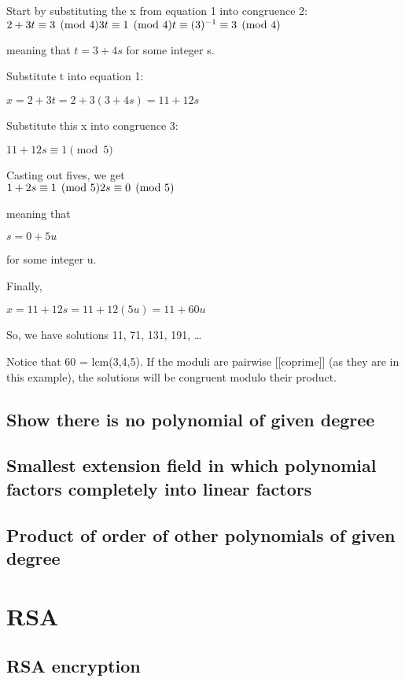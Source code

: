 \documentclass{article}
\begin{document}
Start by substituting the x from equation 1 into congruence 2:\\

$
  2 + 3t \equiv 3 \pmod{4} \\
      3t \equiv 1 \pmod{4} \\
       t \equiv (3)^{-1} \equiv 3 \pmod{4}
$

meaning that $t = 3 + 4s$ for some integer s.

Substitute t into equation 1:

$x = 2 + 3t = 2 + 3(3 + 4s) = 11 + 12s$

Substitute this x into congruence 3:

$11 + 12s \equiv 1 \pmod{5}$

Casting out fives, we get\\

$
  1 + 2s \equiv 1 \pmod{5} \\
      2s \equiv 0 \pmod{5}
$

meaning that

$s = 0 + 5u$

for some integer u.

Finally,

$x = 11 + 12s = 11 + 12(5u) = 11 + 60u$

So, we have solutions 11, 71, 131, 191, …

Notice that 60 = lcm(3,4,5). If the moduli are pairwise [[coprime]] (as they are in this example), the solutions will be congruent modulo their product.



\subsection{Show there is no polynomial of given degree}
\subsection{Smallest extension field in which polynomial factors completely into linear factors}
\subsection{Product of order of other polynomials of given degree}



\section{RSA}
\subsection{RSA encryption}
\end{document}
